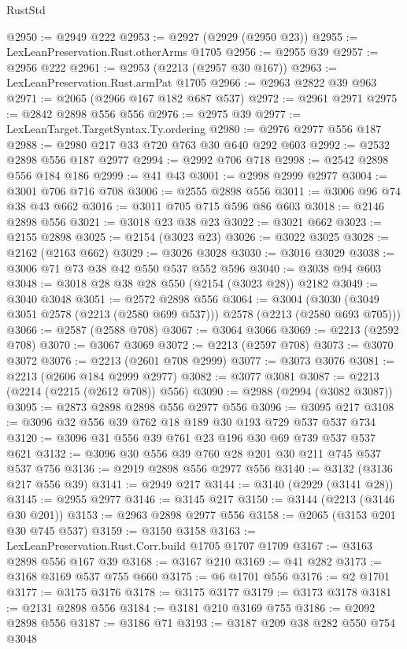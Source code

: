 \begin{lexlean}{RustStd}
\begin{coremodule}
@2950 := @2949 @222
@2953 := @2927 (@2929 (@2950 @23))
@2955 := LexLeanPreservation.Rust.otherArms @1705
@2956 := @2955 @39
@2957 := @2956 @222
@2961 := @2953 (@2213 (@2957 @30 @167))
@2963 := LexLeanPreservation.Rust.armPat @1705
@2966 := @2963 @2822 @39 @963
@2971 := @2065 (@2966 @167 @182 @687 @537)
@2972 := @2961 @2971
@2975 := @2842 @2898 @556 @556
@2976 := @2975 @39
@2977 := LexLeanTarget.TargetSyntax.Ty.ordering
@2980 := @2976 @2977 @556 @187
@2988 := @2980 @217 @33 @720 @763 @30 @640 @292 @603
@2992 := @2532 @2898 @556 @187 @2977
@2994 := @2992 @706 @718
@2998 := @2542 @2898 @556 @184 @186
@2999 := @41 @43
@3001 := @2998 @2999 @2977
@3004 := @3001 @706 @716 @708
@3006 := @2555 @2898 @556
@3011 := @3006 @96 @74 @38 @43 @662
@3016 := @3011 @705 @715 @596 @86 @603
@3018 := @2146 @2898 @556
@3021 := @3018 @23 @38 @23
@3022 := @3021 @662
@3023 := @2155 @2898
@3025 := @2154 (@3023 @23)
@3026 := @3022 @3025
@3028 := @2162 (@2163 @662)
@3029 := @3026 @3028
@3030 := @3016 @3029
@3038 := @3006 @71 @73 @38 @42 @550 @537 @552 @596
@3040 := @3038 @94 @603
@3048 := @3018 @28 @38 @28 @550 (@2154 (@3023 @28)) @2182
@3049 := @3040 @3048
@3051 := @2572 @2898 @556
@3064 := @3004 (@3030 (@3049 @3051 @2578 (@2213 (@2580 @699 @537))) @2578 (@2213 (@2580 @693 @705)))
@3066 := @2587 (@2588 @708)
@3067 := @3064 @3066
@3069 := @2213 (@2592 @708)
@3070 := @3067 @3069
@3072 := @2213 (@2597 @708)
@3073 := @3070 @3072
@3076 := @2213 (@2601 @708 @2999)
@3077 := @3073 @3076
@3081 := @2213 (@2606 @184 @2999 @2977)
@3082 := @3077 @3081
@3087 := @2213 (@2214 (@2215 (@2612 @708)) @556)
@3090 := @2988 (@2994 (@3082 @3087))
@3095 := @2873 @2898 @2898 @556 @2977 @556
@3096 := @3095 @217
@3108 := @3096 @32 @556 @39 @762 @18 @189 @30 @193 @729 @537 @537 @734
@3120 := @3096 @31 @556 @39 @761 @23 @196 @30 @69 @739 @537 @537 @621
@3132 := @3096 @30 @556 @39 @760 @28 @201 @30 @211 @745 @537 @537 @756
@3136 := @2919 @2898 @556 @2977 @556
@3140 := @3132 (@3136 @217 @556 @39)
@3141 := @2949 @217
@3144 := @3140 (@2929 (@3141 @28))
@3145 := @2955 @2977
@3146 := @3145 @217
@3150 := @3144 (@2213 (@3146 @30 @201))
@3153 := @2963 @2898 @2977 @556
@3158 := @2065 (@3153 @201 @30 @745 @537)
@3159 := @3150 @3158
@3163 := LexLeanPreservation.Rust.Corr.build @1705 @1707 @1709
@3167 := @3163 @2898 @556 @167 @39
@3168 := @3167 @210
@3169 := @41 @282
@3173 := @3168 @3169 @537 @755 @660
@3175 := @6 @1701 @556
@3176 := @2 @1701
@3177 := @3175 @3176
@3178 := @3175 @3177
@3179 := @3173 @3178
@3181 := @2131 @2898 @556
@3184 := @3181 @210 @3169 @755
@3186 := @2092 @2898 @556
@3187 := @3186 @71
@3193 := @3187 @209 @38 @282 @550 @754 @3048

\end{coremodule}
\end{lexlean}
